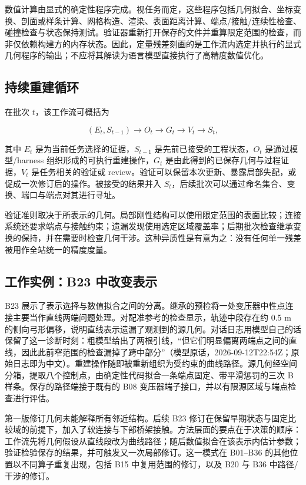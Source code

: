 \documentclass[10pt,a4paper]{article}
\begin{document}
数值计算由显式的确定性程序完成。视任务而定，这些程序包括几何拟合、坐标变换、剖面或样条计算、网格构造、渲染、表面距离计算、端点/接触/连续性检查、碰撞检查与状态保持测试。验证器重新打开保存的文件并重算限定范围的检查，而非仅依赖构建方的内存状态。因此，定量残差刻画的是工作流内选定并执行的显式几何程序的输出；不应将其解读为语言模型直接执行了高精度数值优化。

\hypertarget{ux6301ux7eedux91cdux5efaux5faaux73af}{%
\subsection{持续重建循环}\label{ux6301ux7eedux91cdux5efaux5faaux73af}}

在批次 \(t\)，该工作流可概括为

\[
(E_t, S_{t-1}) \rightarrow O_t \rightarrow G_t \rightarrow V_t \rightarrow S_t,
\]

其中 \(E_t\) 是为当前任务选择的证据，\(S_{t-1}\)
是先前已接受的工程状态，\(O_t\) 是通过模型/harness
组织形成的可执行重建操作，\(G_t\)
是由此得到的已保存几何与过程证据，\(V_t\) 是任务相关的验证或
review。验证可以保留本次更新、暴露局部失配，或促成一次修订后的操作。被接受的结果并入
\(S_t\)，后续批次可以通过命名集合、变换、端口与端点对其进行寻址。

验证准则取决于所表示的几何。局部刚性结构可以使用限定范围的表面比较；连接系统还要求端点与接触约束；遗漏发现使用选定区域覆盖率；后期批次检查继承变换的保持，并在需要时检查几何干涉。这种异质性是有意为之：没有任何单一残差被用作全站统一的精度度量。

\hypertarget{ux5de5ux4f5cux5b9eux4f8bb23-ux4e2dux6539ux53d8ux8868ux793a}{%
\subsection{工作实例：B23
中改变表示}\label{ux5de5ux4f5cux5b9eux4f8bb23-ux4e2dux6539ux53d8ux8868ux793a}}

B23
展示了表示选择与数值拟合之间的分离。继承的预检将一处变压器中性点连接主要当作直线两端问题处理。对配准参考的检查显示，轨迹中段存在约
0.5 m
的侧向弓形偏移，说明直线表示遗漏了观测到的源几何。对话日志用模型自己的话保留了这一诊断时刻：粗模型给出了两根引线，``但它们明显偏离两端点之间的直线，因此此前窄范围的检查漏掉了跨中部分''（模型原话，2026-09-12T22:54Z；原始日志即为中文）。重建操作随即被重新组织为受约束的曲线路径。源几何经空间分箱，提取八个控制点，由确定性代码拟合一条端点固定、带平滑惩罚的三次
B 样条。保存的路径端接于既有的 B08
变压器端子接口，并以有限源区域与端点检查进行评估。

第一版修订几何未能解释所有邻近结构。后续 B23
修订在保留早期状态与固定比较域的前提下，加入了软连接与下部桥架接触。方法层面的要点在于决策的顺序：工作流先将几何假设从直线段改为曲线路径；随后数值拟合在该表示内估计参数；验证检验保存的结果，并可触发又一次局部修订。这一模式在
B01--B36 的其他位置以不同算子重复出现，包括 B15 中复用范围的修订，以及
B20 与 B36 中路径/干涉的修订。
\end{document}
